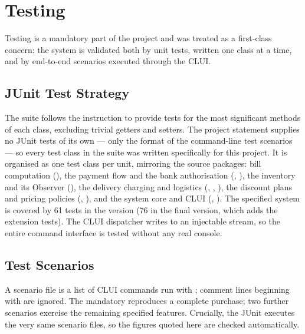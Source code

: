 \chapter{Testing}
\label{ch:testing}

Testing is a mandatory part of the project and was treated as a first-class
concern: the system is validated both by unit tests, written one class at a time,
and by end-to-end scenarios executed through the CLUI.

\section{JUnit Test Strategy}
The suite follows the instruction to provide tests for the most significant
methods of each class, excluding trivial getters and setters. The project
statement supplies no JUnit tests of its own --- only the format of the
command-line test scenarios --- so every test class in the suite was written
specifically for this project. It is organised as
one test class per unit, mirroring the source packages: bill computation
(), the payment flow and the bank authorisation
(,
\allowbreak{}\allowbreak{}\allowbreak{}), the
inventory and its Observer (), the delivery charging
and logistics (, ,
), the discount plans and pricing policies
(, ), and the system core and CLUI
(, ). The specified system is
covered by 61 tests in the  version (76 in the final version, which
adds the extension tests). The CLUI dispatcher writes to an injectable stream, so
the entire command interface is tested without any real console.

\section{Test Scenarios}
A scenario file is a list of CLUI commands run with ; comment lines
beginning with \code{\#} are ignored. The mandatory 
reproduces a complete purchase; two further scenarios exercise the remaining
specified features. Crucially, the JUnit  executes the
very same scenario files, so the figures quoted here are checked automatically.

